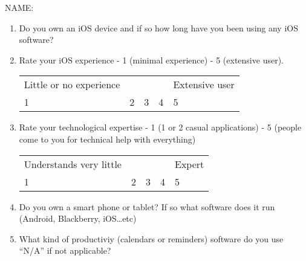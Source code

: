 \documentclass{article}
\begin{document}
\rhead{}

{\large NAME:}
\vspace{1cm}
\begin{enumerate}
        \setlength{\itemsep}{2cm}
    \item Do you own an iOS device and if so how long have you been using any iOS software?
    \item Rate your iOS experience -  1 (minimal experience) - 5 (extensive user).

        \begin{tabularx}{\textwidth}{X X X X X}
            Little or no experience & & & & Extensive user \\
            1&2&3&4&5 \\
        \end{tabularx}
    \item Rate your technological expertise  - 1 (1 or 2 casual applications) - 5 (people come to you for technical help with everything)

        \begin{tabularx}{\textwidth}{X X X X X}
            Understands very little & & & & Expert \\
            1&2&3&4&5 \\
        \end{tabularx}
    \item Do you own a smart phone or tablet? If so what software does it run (Android, Blackberry, iOS\ldots etc)
    \item What kind of productiviy (calendars or reminders) software do you use ``N/A'' if not applicable?
    
\end{enumerate}
\end{document}
